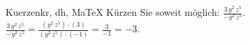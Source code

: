 \begin{MAufgabe}{Kuerzen}{kr, dh, MaTeX}
K\"urzen Sie soweit m\"oglich: $\frac{3\, y^2\, z^5}{- y^2\, z^5}$.\\ 
\ifLsg\MLoesung
\quad $\frac{3\, y^2\, z^5}{- y^2\, z^5}=\frac{(y^2\, z^5)\cdot(3)}{(y^2\, z^5)\cdot(-1)}=\frac{3}{-1}=-3$.\else\relax\fi
 \end{MAufgabe}